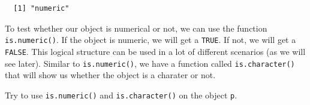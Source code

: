 \documentclass[12pt,oneside]{reedthesis}
\theoremstyle{definition}
\theoremstyle{definition}
\theoremstyle{definition}
\theoremstyle{remark}
\begin{document}
  \begin{verbatim}
  [1] "numeric"
  \end{verbatim}
  To test whether our object is numerical or not, we can use the function
  \texttt{is.numeric()}. If the object is numeric, we will get a
  \texttt{TRUE}. If not, we will get a \texttt{FALSE}. This logical
  structure can be used in a lot of different scenarios (as we will see
  later). Similar to \texttt{is.numeric()}, we have a function called
  \texttt{is.character()} that will show us whether the object is a
  charater or not.
  \begin{Shaded}
  \begin{Highlighting}[]
  \end{Highlighting}
  \end{Shaded}
  Try to use \texttt{is.numeric()} and \texttt{is.character()} on the
  object \texttt{p}.
  
\end{document}
